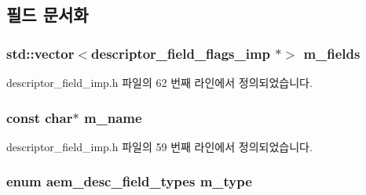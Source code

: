 \subsection{필드 문서화}
\subsubsection[{\texorpdfstring{m\+\_\+fields}{m_fields}}]{\setlength{\rightskip}{0pt plus 5cm}std\+::vector$<${\bf descriptor\+\_\+field\+\_\+flags\+\_\+imp} $\ast$$>$ m\+\_\+fields\hspace{0.3cm}{\ttfamily [private]}}\hypertarget{classavdecc__lib_1_1descriptor__field__imp_a3edc59da2f7daed82de121c68c5dc06e}{}\label{classavdecc__lib_1_1descriptor__field__imp_a3edc59da2f7daed82de121c68c5dc06e}


descriptor\+\_\+field\+\_\+imp.\+h 파일의 62 번째 라인에서 정의되었습니다.

\subsubsection[{\texorpdfstring{m\+\_\+name}{m_name}}]{\setlength{\rightskip}{0pt plus 5cm}const char$\ast$ m\+\_\+name\hspace{0.3cm}{\ttfamily [private]}}\hypertarget{classavdecc__lib_1_1descriptor__field__imp_aabec0ab061a518c77ba7c2925ad46d44}{}\label{classavdecc__lib_1_1descriptor__field__imp_aabec0ab061a518c77ba7c2925ad46d44}


descriptor\+\_\+field\+\_\+imp.\+h 파일의 59 번째 라인에서 정의되었습니다.

\subsubsection[{\texorpdfstring{m\+\_\+type}{m_type}}]{\setlength{\rightskip}{0pt plus 5cm}enum {\bf aem\+\_\+desc\+\_\+field\+\_\+types} m\+\_\+type\hspace{0.3cm}{\ttfamily [private]}}\hypertarget{classavdecc__lib_1_1descriptor__field__imp_a844fce2d4575b6a8ba713116e57163e3}{}\label{classavdecc__lib_1_1descriptor__field__imp_a844fce2d4575b6a8ba713116e57163e3}


